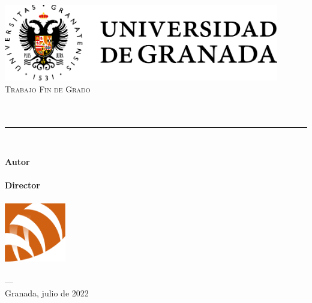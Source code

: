 \begin{titlepage}

    \newlength{\centeroffset}
    \setlength{\centeroffset}{-0.5\oddsidemargin}
    \addtolength{\centeroffset}{0.5\evensidemargin}
    \thispagestyle{empty}

    \noindent\hspace*{\centeroffset}\begin{minipage}{\textwidth}
        \centering
        \includegraphics[width=0.9\textwidth]{image/logo_ugr_horizontal.png}\\[1.4cm]

        \textsc{\Large Trabajo Fin de Grado\\[0.2cm]}
        \textsc{\myDegree}\\[1cm]
        { \Huge\bfseries \myTitleShort\\ }
        \noindent\rule[-1ex]{ \textwidth }{3pt}\\[3.5ex]
        { \large\bfseries \myTitle }
    \end{minipage}

    \vspace{2.5cm}
    
    \noindent\hspace*{\centeroffset}\begin{minipage}{\textwidth}
        \centering
        \textbf{Autor}\\ {\myName}\\[2.5ex]
        \textbf{Director}\\ {\myProf}\\[2cm]
    
        \includegraphics[width=0.2\textwidth]{image/etsiit_logo.png}\\[0.1cm]
        \textsc{\myFaculty}\\
        \textsc{---}\\
        Granada, julio de 2022
    \end{minipage}
    
    
\end{titlepage}


